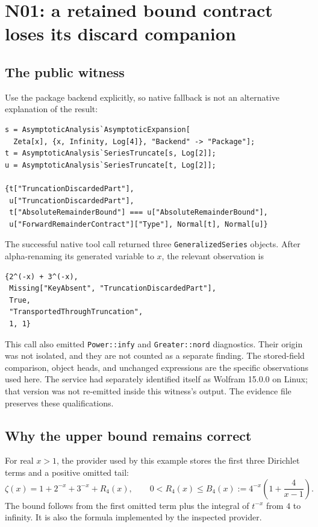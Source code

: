 \documentclass[11pt,letterpaper]{article}
\newcommand{\prop}[1]{\texttt{#1}}
\begin{document}
\section{N01: a retained bound contract loses its discard companion}
\label{sec:n01}

\subsection{The public witness}

Use the package backend explicitly, so native fallback is not an alternative
explanation of the result:

\begin{lstlisting}[language=Wolfram]
s = AsymptoticAnalysis`AsymptoticExpansion[
  Zeta[x], {x, Infinity, Log[4]}, "Backend" -> "Package"];
t = AsymptoticAnalysis`SeriesTruncate[s, Log[2]];
u = AsymptoticAnalysis`SeriesTruncate[t, Log[2]];

{t["TruncationDiscardedPart"],
 u["TruncationDiscardedPart"],
 t["AbsoluteRemainderBound"] === u["AbsoluteRemainderBound"],
 u["ForwardRemainderContract"]["Type"], Normal[t], Normal[u]}
\end{lstlisting}

The successful native tool call returned three \prop{GeneralizedSeries} objects.
After alpha-renaming its generated variable to $x$, the relevant observation is
\begin{lstlisting}[language=Wolfram]
{2^(-x) + 3^(-x),
 Missing["KeyAbsent", "TruncationDiscardedPart"],
 True,
 "TransportedThroughTruncation",
 1, 1}
\end{lstlisting}

This call also emitted \prop{Power::infy} and \prop{Greater::nord} diagnostics.
Their origin was not isolated, and they are not counted as a separate finding.
The stored-field comparison, object heads, and unchanged expressions are the
specific observations used here. The service had separately identified itself
as Wolfram 15.0.0 on Linux; that version was not re-emitted inside this witness's
output. The evidence file preserves these qualifications.

\subsection{Why the upper bound remains correct}

For real $x>1$, the provider used by this example stores the first three
Dirichlet terms and a positive omitted tail:
\[
 \zeta(x)=1+2^{-x}+3^{-x}+R_4(x),
 \qquad
 0<R_4(x)\le B_4(x):=4^{-x}\left(1+\frac{4}{x-1}\right).
\]
The bound follows from the first omitted term plus the integral of $t^{-x}$ from
$4$ to infinity. It is also the formula implemented by the inspected provider.
\cite{dirichlet}
\end{document}
